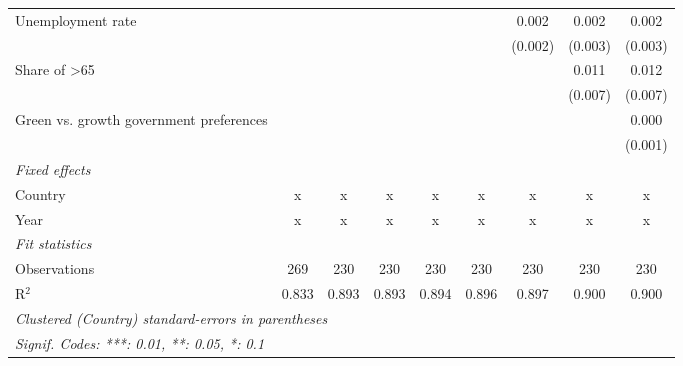\begin{table}[htbp]
\begin{tabular}{lcccccccc}
      Unemployment rate                                &         &         &         &         &         & 0.002       & 0.002        & 0.002\\   
                                                       &         &         &         &         &         & (0.002)     & (0.003)      & (0.003)\\   
      Share of >65                                     &         &         &         &         &         &             & 0.011        & 0.012\\   
                                                       &         &         &         &         &         &             & (0.007)      & (0.007)\\   
      Green vs. growth government preferences          &         &         &         &         &         &             &              & 0.000\\   
                                                       &         &         &         &         &         &             &              & (0.001)\\   
      \emph{Fixed effects}\\
      Country                                          & x       & x       & x       & x       & x       & x           & x            & x\\  
      Year                                             & x       & x       & x       & x       & x       & x           & x            & x\\  
      \midrule \emph{Fit statistics}\\
      Observations                                     & 269     & 230     & 230     & 230     & 230     & 230         & 230          & 230\\  
      R$^2$                                            & 0.833   & 0.893   & 0.893   & 0.894   & 0.896   & 0.897       & 0.900        & 0.900\\  
      \midrule
      \multicolumn{9}{l}{\emph{Clustered (Country) standard-errors in parentheses}}\\
      \multicolumn{9}{l}{\emph{Signif. Codes: ***: 0.01, **: 0.05, *: 0.1}}\\
   \end{tabular}
\end{table}


